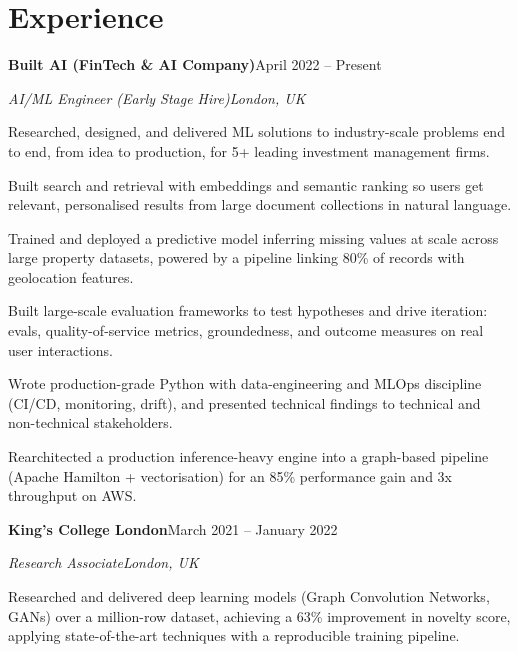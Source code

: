 \documentclass[10pt,a4paper]{article}
\newcommand{\entry}[4]{%
  {\color{company}\bfseries #1}\hfill {\color{muted}#2}\par
  \vspace{1pt}
  {\itshape #3}\hfill {\color{muted}\itshape #4}\par
  \vspace{3pt}%
}
\begin{document}
\section{Experience}
\entry{Built AI (FinTech \& AI Company)}{April 2022 -- Present}{AI/ML Engineer (Early Stage Hire)}{London, UK}
\begin{tight}
  \item Researched, designed, and delivered ML solutions to industry-scale problems end to end, from idea to production, for 5+ leading investment management firms.
  \item Built search and retrieval with embeddings and semantic ranking so users get relevant, personalised results from large document collections in natural language.
  \item Trained and deployed a predictive model inferring missing values at scale across large property datasets, powered by a pipeline linking 80\% of records with geolocation features.
  \item Built large-scale evaluation frameworks to test hypotheses and drive iteration: evals, quality-of-service metrics, groundedness, and outcome measures on real user interactions.
  \item Wrote production-grade Python with data-engineering and MLOps discipline (CI/CD, monitoring, drift), and presented technical findings to technical and non-technical stakeholders.
  \item Rearchitected a production inference-heavy engine into a graph-based pipeline (Apache Hamilton + vectorisation) for an 85\% performance gain and 3x throughput on AWS.
\end{tight}

\entry{King's College London}{March 2021 -- January 2022}{Research Associate}{London, UK}
\begin{tight}
  \item Researched and delivered deep learning models (Graph Convolution Networks, GANs) over a million-row dataset, achieving a 63\% improvement in novelty score, applying state-of-the-art techniques with a reproducible training pipeline.
\end{tight}

\end{document}
